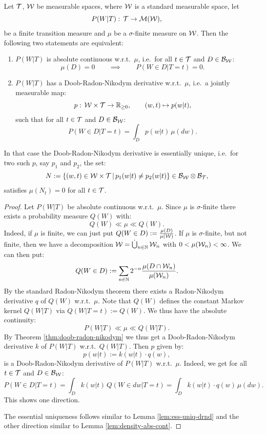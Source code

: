 \begin{Cor}
    \label{cor:doob-radon-nikodym}
    Let $\mathcal{T}$, $\mathcal{W}$ be measurable spaces, where $\mathcal{W}$ is a standard measurable space, let
    \[ P(W|T):\, \mathcal{T} \to \mathcal{M}(\mathcal{W}),  \]
    be a finite transition measure and $\mu$ be a $\sigma$-finite measure on $\mathcal{W}$.
    Then the following two statements are equivalent:
    \begin{enumerate}
        \item $P(W|T)$ is absolute continuous w.r.t.\ $\mu$, i.e.\ for all $t \in \mathcal{T}$ and $D \in \mathcal{B}_{\mathcal{W}}$:
            \[ \mu(D) =0 \qquad \implies \qquad P(W \in D|T=t) = 0.  \]
        \item $P(W|T)$ has a Doob-Radon-Nikodym derivative w.r.t.\ $\mu$, i.e.\ a jointly measurable map:
                \[ p:\, \mathcal{W} \times \mathcal{T} \to \mathbb{R}_{\ge0}, \qquad (w,t) \mapsto p(w|t),  \]
              such that for all $t \in \mathcal{T}$ and $D \in \mathcal{B}_{\mathcal{W}}$:
              \[ P(W \in D|T=t) = \int_D p(w|t) \, \mu(dw).  \]
    \end{enumerate}
    In that case the Doob-Radon-Nikodym derivative is essentially unique, i.e.\ for two such $p$, say $p_1$ and $p_2$,  the set:
    \[ N := \left \{ (w,t) \in \mathcal{W} \times \mathcal{T} \,\middle|\, p_1(w|t) \neq p_2(w|t) \right \} \in \mathcal{B}_{\mathcal{W}}\otimes\mathcal{B}_{\mathcal{T}}, \]
    satisfies $\mu(N_t)=0$ for all $t \in \mathcal{T}$.
\begin{proof}
    Let $P(W|T)$ be absolute continuous w.r.t.\ $\mu$.
    Since $\mu$ is $\sigma$-finite there exists a probability measure $Q(W)$ with:
    \[ Q(W) \ll \mu \ll Q(W). \]
    Indeed, if $\mu$ is finite, we can just put $Q(W \in D) := \frac{\mu(D)}{\mu(\mathcal{W})}$. If $\mu$ is $\sigma$-finite, but not finite, then we have a decomposition $\mathcal{W} = \mathop{\dot{\bigcup}}_{n \in \mathbb{N}} \mathcal{W}_n$ with $0<\mu(\mathcal{W}_n)<\infty$. We can then put:
    \[
        Q(W \in D) := \sum_{n \in \mathbb{N}} 2^{-n} \frac{\mu(D \cap \mathcal{W}_n)}{\mu(\mathcal{W}_n)}.
    \]
    By the standard Radon-Nikodym theorem there exists a Radon-Nikodym derivative $q$ of $Q(W)$ w.r.t.\ $\mu$. 
    Note that $Q(W)$ defines the constant Markov kernel $Q(W|T)$ via $Q(W|T=t) := Q(W)$.
    We thus have the absolute continuity:
    \[ P(W|T) \ll \mu \ll Q(W|T). \]
    By Theorem \ref{thm:doob-radon-nikodym} we thus get a Doob-Radon-Nikodym derivative $k$ of $P(W|T)$ w.r.t.\ $Q(W|T)$. Then $p$ given by:
    \[ p(w|t) := k(w|t) \cdot q(w),\]
    is a Doob-Radon-Nikodym derivative of $P(W|T)$ w.r.t.\ $\mu$. 
    Indeed, we get for all $t \in \mathcal{T}$ and $D \in \mathcal{B}_{\mathcal{W}}$:
    \[ P(W \in D|T=t) = \int_D k(w|t) \, Q(W \in dw|T=t) = \int_D k(w|t) \cdot q(w) \, \mu(dw).  \]
    This shows one direction.
    
    The essential uniqueness follows similar to Lemma \ref{lem:ess-uniq-drnd} and the other direction similar to Lemma \ref{lem:density-abs-cont}. 
\end{proof}
\end{Cor}


